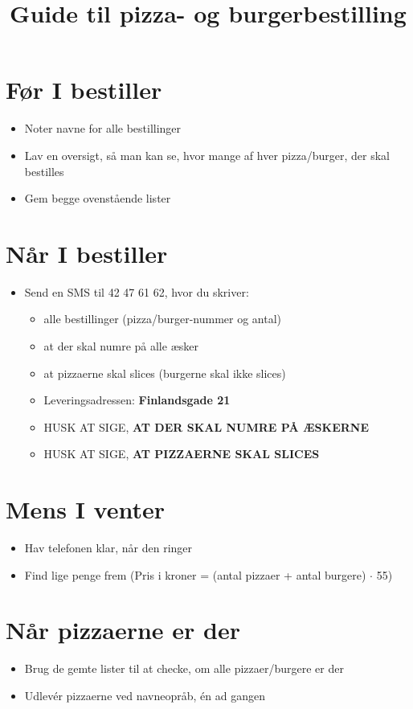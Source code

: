 \documentclass[a4paper,danish]{article}
\title{Guide til pizza- og burgerbestilling}
\author{}
\begin{document}
\maketitle

\section{Før I bestiller}
\begin{itemize}
  \item Noter navne for alle bestillinger
  \item Lav en oversigt, så man kan se, hvor mange af hver pizza/burger, der skal bestilles
    \item Gem begge ovenstående lister
\end{itemize}
\section{Når I bestiller}
\begin{itemize}
  \item Send en SMS til 42 47 61 62, hvor du skriver:
    \begin{itemize}
      \item alle bestillinger (pizza/burger-nummer og antal)
      \item at der skal numre på alle æsker
      \item at pizzaerne skal slices (burgerne skal ikke slices)
      \item Leveringsadressen: \textbf{Finlandsgade 21}
      \item HUSK AT SIGE, \textbf{AT DER SKAL NUMRE PÅ ÆSKERNE}
      \item HUSK AT SIGE, \textbf{AT PIZZAERNE SKAL SLICES} 
    \end{itemize}
\end{itemize}

\section{Mens I venter}
\begin{itemize}
  \item Hav telefonen klar, når den ringer
  \item Find lige penge frem (Pris i kroner = (antal pizzaer + antal burgere) $\cdot$ 55)
\end{itemize}

\section{Når pizzaerne er der}
\begin{itemize}
  \item Brug de gemte lister til at checke, om alle pizzaer/burgere er der
  \item Udlevér pizzaerne ved navneopråb, én ad gangen
\end{itemize}
\end{document}
